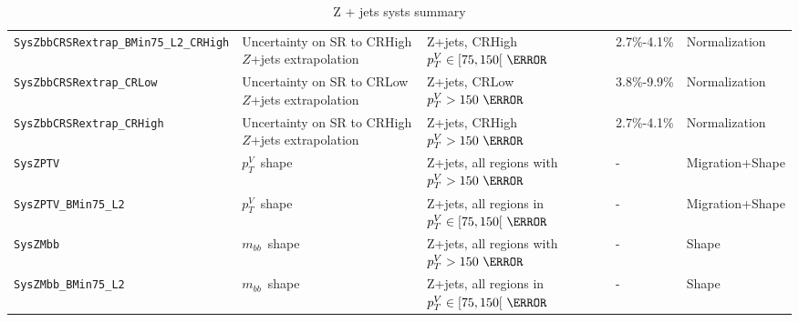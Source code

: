 \begin{table}
{\begin{tabular}{lllll}
  \texttt{SysZbbCRSRextrap\_BMin75\_L2\_CRHigh} & Uncertainty on SR to CRHigh $Z$+jets extrapolation & Z+jets, CRHigh $p_T^V\in[75,150[~\GeV$ & 2.7\%-4.1\% & Normalization\\        
  \texttt{SysZbbCRSRextrap\_CRLow} & Uncertainty on SR to CRLow $Z$+jets extrapolation & Z+jets, CRLow $p_T^V>150~\GeV$ & 3.8\%-9.9\% & Normalization\\        
  \texttt{SysZbbCRSRextrap\_CRHigh} & Uncertainty on SR to CRHigh $Z$+jets extrapolation & Z+jets, CRHigh $p_T^V>150~\GeV$ & 2.7\%-4.1\% & Normalization\\           
  \texttt{SysZPTV} & $p_T^V$\ shape & Z+jets, all regions with $p_T^V>150~\GeV$ & - & Migration+Shape \\
  \texttt{SysZPTV\_BMin75\_L2} & $p_T^V$\ shape & Z+jets, all regions in $p_T^V\in[75,150[~\GeV$ & - & Migration+Shape \\
  \texttt{SysZMbb} & $m_{bb}$\ shape & Z+jets, all regions with $p_T^V>150~\GeV$ & - & Shape \\
  \texttt{SysZMbb\_BMin75\_L2} & $m_{bb}$\ shape & Z+jets, all regions in $p_T^V\in[75,150[~\GeV$ & - & Shape \\
\bottomrule
\end{tabular}
}
\caption{Z + jets systs summary}
\label{tab:Zjets_systematics}
\end{table}